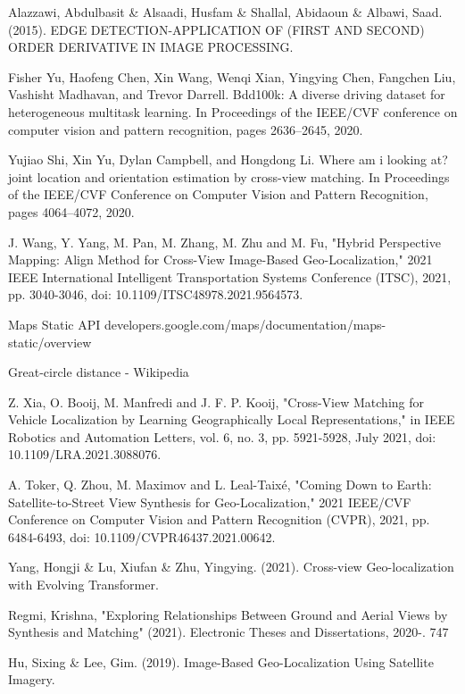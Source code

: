 \documentclass[10pt,letterpaper]{article}
\begin{document}
\begin{thebibliography}{10}
  Alazzawi, Abdulbasit \& Alsaadi, Husfam \& Shallal, Abidaoun \& Albawi, Saad. (2015). EDGE DETECTION-APPLICATION OF (FIRST AND SECOND) ORDER DERIVATIVE IN IMAGE PROCESSING. 
  
  Fisher Yu, Haofeng Chen, Xin Wang, Wenqi Xian, Yingying Chen, Fangchen Liu, Vashisht Madhavan, and Trevor Darrell. Bdd100k: A diverse driving dataset for heterogeneous multitask learning. In Proceedings of the IEEE/CVF conference on computer vision and pattern recognition, pages 2636–2645, 2020.
  
   Yujiao Shi, Xin Yu, Dylan Campbell, and Hongdong Li. Where am i looking at? joint location and orientation estimation by cross-view matching. In Proceedings of the IEEE/CVF Conference on Computer Vision and Pattern Recognition, pages 4064–4072, 2020.
  
  J. Wang, Y. Yang, M. Pan, M. Zhang, M. Zhu and M. Fu, "Hybrid Perspective Mapping: Align Method for Cross-View Image-Based Geo-Localization," 2021 IEEE International Intelligent Transportation Systems Conference (ITSC), 2021, pp. 3040-3046, doi: 10.1109/ITSC48978.2021.9564573.
  
  Maps Static API developers.google.com/maps/documentation/maps-static/overview
  
  Great-circle distance - Wikipedia
  
  Z. Xia, O. Booij, M. Manfredi and J. F. P. Kooij, "Cross-View Matching for Vehicle Localization by Learning Geographically Local Representations," in IEEE Robotics and Automation Letters, vol. 6, no. 3, pp. 5921-5928, July 2021, doi: 10.1109/LRA.2021.3088076.
  
  A. Toker, Q. Zhou, M. Maximov and L. Leal-Taixé, "Coming Down to Earth: Satellite-to-Street View Synthesis for Geo-Localization," 2021 IEEE/CVF Conference on Computer Vision and Pattern Recognition (CVPR), 2021, pp. 6484-6493, doi: 10.1109/CVPR46437.2021.00642.
  
  Yang, Hongji \& Lu, Xiufan \& Zhu, Yingying. (2021). Cross-view Geo-localization with Evolving Transformer. 
  
  Regmi, Krishna, "Exploring Relationships Between Ground and Aerial Views by Synthesis and Matching" (2021). Electronic Theses and Dissertations, 2020-. 747
  
  Hu, Sixing \& Lee, Gim. (2019). Image-Based Geo-Localization Using Satellite Imagery. 
  

\end{thebibliography}
\end{document}
